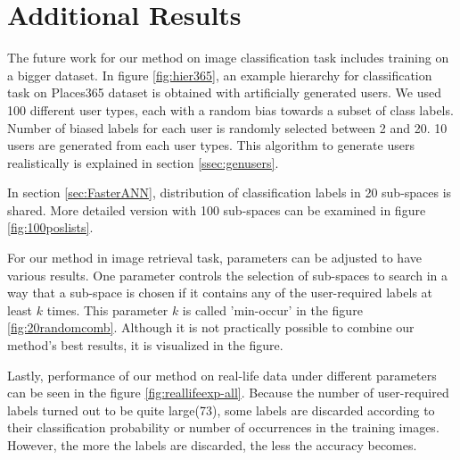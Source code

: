 
\lhead[\chaptername~\thechapter]{\rightmark}

\rhead[\leftmark]{}

\lfoot[\thepage]{}

\cfoot{}

\rfoot[]{\thepage}

\chapter{Additional Results\label{Appen}}

The future work for our method on image classification task includes training on a bigger dataset. 
In figure \ref{fig:hier365}, an example hierarchy for classification task on Places365 dataset is obtained with artificially generated users.
We used 100 different user types, each with a random bias towards a subset of class labels. Number of biased labels for each user is randomly selected between 2 and 20. 
10 users are generated from each user types. This algorithm to generate users realistically is explained in section \ref{ssec:genusers}.

In section \ref{sec:FasterANN}, distribution of classification labels in 20 sub-spaces is shared. More detailed version with 100 sub-spaces can be examined in figure \ref{fig:100poslists}.

For our method in image retrieval task, parameters can be adjusted to have various results. 
One parameter controls the selection of sub-spaces to search in a way that a sub-space is chosen if it contains any of the user-required labels at least $k$ times. 
This parameter $k$ is called 'min-occur' in the figure \ref{fig:20randomcomb}. 
Although it is not practically possible to combine our method's best results, it is visualized in the figure.

Lastly, performance of our method on real-life data under different parameters can be seen in the figure \ref{fig:reallifeexp-all}. 
Because the number of user-required labels turned out to be quite large(73), some labels are discarded according to their classification probability or number of occurrences in the training images. 
However, the more the labels are discarded, the less the accuracy becomes.


